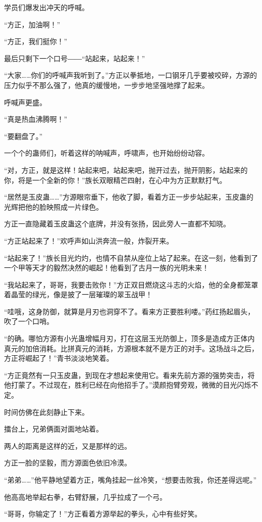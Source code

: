 \begin{this_body}
学员们爆发出冲天的呼喊。

“方正，加油啊！”

“方正，我们挺你！”

最后只剩下一个口号――“站起来，站起来！”

“大家……你们的呼喊声我听到了。”方正以拳抵地，一口钢牙几乎要被咬碎，方源的压力似乎不那么强了，他真的缓慢地，一步步地坚强地撑了起来。

呼喊声更盛。

“真是热血沸腾啊！”

“要翻盘了。”

一个个的蛊师们，听着这样的呐喊声，呼啸声，也开始纷纷动容。

“对，方正，就是这样！站起来吧，站起来吧，抛开过去，抛开阴影，站起来的你，将是一个全新的你！”族长双眼精芒四射，在心中为方正默默打气。

“居然是玉皮蛊……”方源眼帘垂下，他收了脚，看着方正一步步站起来，玉皮蛊的光辉把他的脸映照成一片绿色。

方正一直隐藏着玉皮蛊这个底牌，并没有张扬，因此旁人一直都不知晓。

“方正站起来了！”欢呼声如山洪奔流一般，炸裂开来。

“站起来了！”族长目光灼灼，也情不自禁从座位上站了起来。在这一刻，他看到了一个甲等天才的毅然决然的崛起！他看到了古月一族的光明未来！

“我站起来了，哥哥，我要击败你！”方正双目燃烧这斗志的火焰，他的全身都笼罩着晶莹的绿光，像是披了一层璀璨的翠玉战甲！

“哇哦，这身防御，就算是月刃也洞穿不了。看来方正要胜利喽。”药红扬起眉头，吹了一个口哨。

“的确。哪怕方源有小光蛊增幅月刃，打在这层玉光防御上，顶多是造成方正体内真元的加倍消耗。比拼真元的消耗，方源根本就不是方正的对手。这场战斗之后，方正将崛起了！”青书淡淡地笑着。

“方正竟然有一只玉皮蛊，到现在才想起来使用它。看来先前方源的强势突击，将他打蒙了。不过现在，胜利已经在向他招手了。”漠颜抱臂旁观，微微的目光闪烁不定。

时间仿佛在此刻静止下来。

擂台上，兄弟俩面对面地站着。

两人的距离是这样的近，又是那样的远。

方正一脸的坚毅，而方源面色依旧冷漠。

“弟弟……”他平静地望着方正，嘴角挂起一丝冷笑，“想要击败我，你还差得远呢。”

他高高地举起右拳，右臂舒展，几乎拉成了一个弓。

“哥哥，你输定了！”方正看着方源举起的拳头，心中有些好笑。


\end{this_body}
